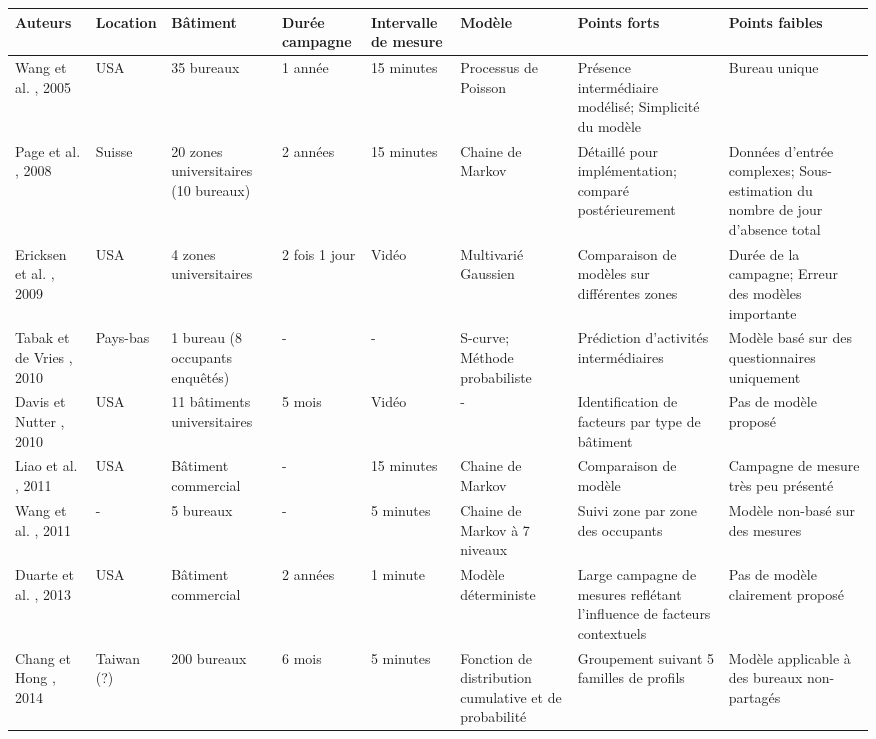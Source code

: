 \begin{landscape}
\begin{table} [H]
\begin{tabular}{|p{2.5cm}|p{2cm}|p{2cm}|p{2cm}|p{2cm}|p{2cm}|p{4cm}|p{4cm}|}
\hline 
Auteurs & Location & Bâtiment & Durée campagne & Intervalle de mesure & Modèle & Points forts & Points faibles \\ 
\hline 
\hline
Wang et al. \cite{Wang-05}, 2005 & USA & 35 bureaux & 1 année & 15 minutes & Processus de Poisson & Présence intermédiaire modélisé; Simplicité du modèle & Bureau unique \\ 
\hline 
Page et al. \cite{Page-08}, 2008 & Suisse & 20 zones universitaires (10 bureaux) & 2 années & 15 minutes & Chaine de Markov & Détaillé pour implémentation; comparé postérieurement & Données d'entrée complexes; Sous-estimation du nombre de jour d'absence total \\ 
\hline 
Ericksen et al. \cite{Erickson-09}, 2009 & USA & 4 zones universitaires & 2 fois 1 jour & Vidéo & Multivarié Gaussien & Comparaison de modèles sur différentes zones & Durée de la campagne; Erreur des modèles importante  \\ 
\hline 
Tabak et de Vries \cite{Tabak-10}, 2010 & Pays-bas & 1 bureau (8 occupants enquêtés) & - & - & S-curve; Méthode probabiliste & Prédiction d'activités intermédiaires  & Modèle basé sur des questionnaires uniquement \\ 
\hline 
Davis et Nutter \cite{Davis-10}, 2010 & USA & 11 bâtiments universitaires & 5 mois & Vidéo & - & Identification de facteurs par type de bâtiment & Pas de modèle proposé \\ 
\hline 
Liao et al. \cite{Liao-11}, 2011 & USA & Bâtiment commercial & - & 15 minutes & Chaine de Markov & Comparaison de modèle & Campagne de mesure très peu présenté \\ 
\hline 
Wang et al. \cite{Wang-11}, 2011 & - & 5 bureaux & - & 5 minutes & Chaine de Markov à 7 niveaux & Suivi zone par zone des occupants & Modèle non-basé sur des mesures \\ 
\hline 
Duarte et al. \cite{Duarte-13}, 2013 & USA & Bâtiment commercial & 2 années & 1 minute & Modèle déterministe & Large campagne de mesures reflétant l'influence de facteurs contextuels & Pas de modèle clairement proposé \\ 
\hline 
Chang et Hong \cite{Chang-14}, 2014 & Taiwan (?) & 200 bureaux & 6 mois & 5 minutes & Fonction de distribution cumulative et de probabilité & Groupement suivant 5 familles de profils & Modèle applicable à des bureaux non-partagés \\ 

\end{tabular}
\end{table}
\end{landscape}
